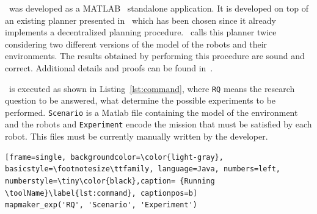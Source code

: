 
\toolName\  was developed as a  MATLAB~\cite{matlab} standalone application.
It is developed on top of an existing  planner presented in~\cite{tumova2016multi} which has been chosen since it already implements a decentralized planning procedure.
\toolName\ calls this planner twice considering two different versions of the model of the robots and their environments. 
The results obtained by performing this procedure are sound and correct.
Additional details and proofs can be found in~\cite{mapmaker17}.


\toolName\ is executed as shown in Listing~\ref{lst:command}, where \texttt{RQ} means the research question to be answered, what determine the possible experiments to be performed.
\texttt{Scenario} is a Matlab file containing the model of the environment and the robots and \texttt{Experiment} encode the mission that must be satisfied by each robot.
This files must be currently manually written by the developer.


\begin{lstlisting}[frame=single, backgroundcolor=\color{light-gray}, basicstyle=\footnotesize\ttfamily, language=Java, numbers=left, numberstyle=\tiny\color{black},caption= {Running \toolName}\label{lst:command}, captionpos=b]
mapmaker_exp('RQ', 'Scenario', 'Experiment')
\end{lstlisting}







